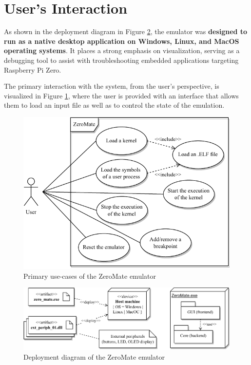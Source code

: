 \documentclass[english, ing, kiv, he, iso690numb, pdf]{fasthesis}
\begin{document}
	
	\newpage
	
	\section{User's Interaction}
	
	As shown in the deployment diagram in Figure \ref{Deployment diagram of the ZeroMate emulator}, the emulator was \textbf{designed to run as a native desktop application on Windows, Linux, and MacOS operating systems}. It places a strong emphasis on visualization, serving as a debugging tool to assist with troubleshooting embedded applications targeting Raspberry Pi Zero.
	
	The primary interaction with the system, from the user's perspective, is visualized in Figure \ref{Primary use-cases of the ZeroMate emulator}, where the user is provided with an interface that allows them to load an input file as well as to control the state of the emulation.
	
	\begin{figure}[ht]
		\centering
		\includegraphics[width=.8\textwidth]{img/diagrams/use_case_diagram.pdf}
		\caption{Primary use-cases of the ZeroMate emulator}
		\label{Primary use-cases of the ZeroMate emulator}
	\end{figure}
	
	\begin{figure}[ht]
		\centering
		\includegraphics[width=1.0\textwidth]{img/diagrams/deployment_diagram.pdf}
		\caption{Deployment diagram of the ZeroMate emulator}
		\label{Deployment diagram of the ZeroMate emulator}
	\end{figure}
	
\end{document}
